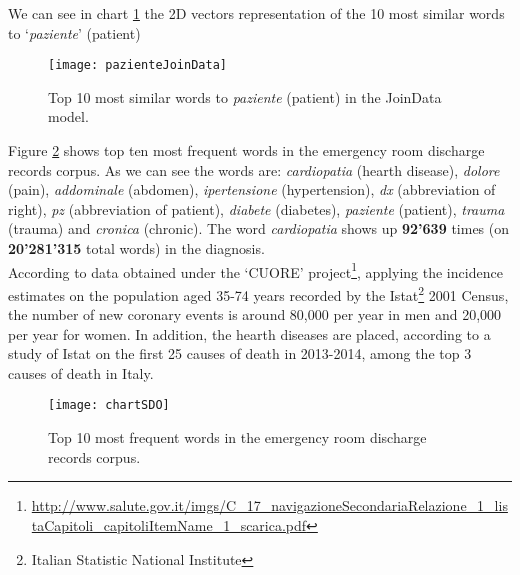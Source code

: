 We can see in chart \ref{fig:pazienteJoinData} the 2D vectors representation of the 10 most similar words to \enquote*{\textit{paziente}} (patient)
\begin{figure}[ht]
	\centering
	\texttt{[image: pazienteJoinData]}
	\caption[Patient - 10 most similar words plotted for JoinData model]{Top 10 most similar words to \textit{paziente} (patient) in the JoinData model.}
	\label{fig:pazienteJoinData}
\end{figure}




Figure \ref{fig:chartSDO} shows top ten most frequent words in the emergency room discharge records corpus. As we can see the words are: \textit{cardiopatia} (hearth disease), \textit{dolore} (pain), \textit{addominale} (abdomen), \textit{ipertensione} (hypertension), \textit{dx} (abbreviation of right), \textit{pz} (abbreviation of patient), \textit{diabete} (diabetes), \textit{paziente} (patient), \textit{trauma} (trauma) and \textit{cronica} (chronic).
The word \textit{cardiopatia} shows up \textbf{92'639} times (on \textbf{20'281'315} total words) in the diagnosis. \\
According to data obtained under the \enquote*{CUORE} project\footnote{\url{http://www.salute.gov.it/imgs/C_17_navigazioneSecondariaRelazione_1_listaCapitoli_capitoliItemName_1_scarica.pdf}}, applying the incidence estimates on the population aged 35-74 years recorded by the Istat\footnote{\label{istat}Italian Statistic National Institute} 2001 Census, the number of new coronary events is around 80,000 per year in men and 20,000 per year for women.
In addition, the hearth diseases are placed, according to a study of Istat on the first 25 causes of death in 2013-2014, among the top 3 causes of death in Italy.
\begin{figure}[ht]
	\centering
	\texttt{[image: chartSDO]}
	\caption[Top 10 most frequent words in emergency room discharge records]{Top 10 most frequent words in the emergency room discharge records corpus.}
	\label{fig:chartSDO}
\end{figure}


